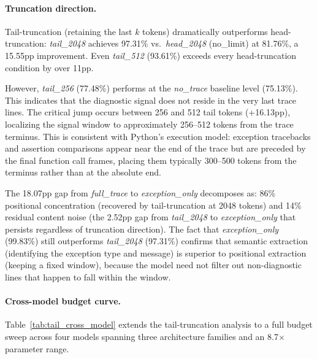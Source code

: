 \paragraph{Truncation direction.}
Tail-truncation (retaining the last $k$ tokens) dramatically outperforms head-truncation: \textit{tail\_2048} achieves 97.31\% vs.\ \textit{head\_2048} (no\_limit) at 81.76\%, a 15.55pp improvement.
Even \textit{tail\_512} (93.61\%) exceeds every head-truncation condition by over 11pp.

However, \textit{tail\_256} (77.48\%) performs at the \textit{no\_trace} baseline level (75.13\%). This indicates that the diagnostic signal does not reside in the very last trace lines.
The critical jump occurs between 256 and 512 tail tokens (+16.13pp), localizing the signal window to approximately 256--512 tokens from the trace terminus.
This is consistent with Python's execution model: exception tracebacks and assertion comparisons appear near the end of the trace but are preceded by the final function call frames, placing them typically 300--500 tokens from the terminus rather than at the absolute end.

The 18.07pp gap from \textit{full\_trace} to \textit{exception\_only} decomposes as: 86\% positional concentration (recovered by tail-truncation at 2048 tokens) and 14\% residual content noise (the 2.52pp gap from \textit{tail\_2048} to \textit{exception\_only} that persists regardless of truncation direction).
The fact that \textit{exception\_only} (99.83\%) still outperforms \textit{tail\_2048} (97.31\%) confirms that semantic extraction (identifying the exception type and message) is superior to positional extraction (keeping a fixed window), because the model need not filter out non-diagnostic lines that happen to fall within the window.

\paragraph{Cross-model budget curve.}
Table~\ref{tab:tail_cross_model} extends the tail-truncation analysis to a full budget sweep across four models spanning three architecture families and an 8.7$\times$ parameter range.


